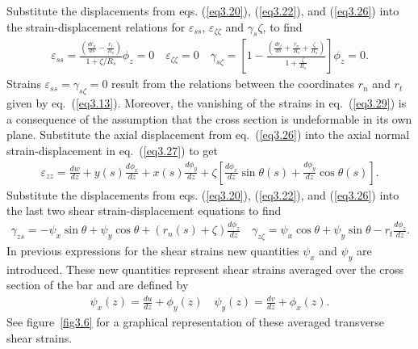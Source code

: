 \documentclass{AeroStructure-ERJohnson}
\begin{document}
Substitute the displacements from eqs. (\ref{eq3.20}), (\ref{eq3.22}), and (\ref{eq3.26}) into the strain-displacement relations for $\varepsilon_{ss}$, $\mathcal{\varepsilon}_{\zeta \zeta}$ and $\gamma_{s} \zeta$, to find
\begin{align}\label{eq3.29}
\varepsilon_{s s}=\frac{\left(\frac{d r_{n}}{d s}-\frac{r_{t}}{R_{s}}\right)}{1+\zeta / R_{s}} \phi_{z}=0 \quad \varepsilon_{\zeta \zeta}=0 \quad \gamma_{s \zeta}=\left[1-\frac{\left(\frac{d r_{t}}{d s}+\frac{r_{n}}{R_{s}}+\frac{\zeta}{R_{s}}\right)}{1+\frac{\zeta}{R_{s}}}\right] \phi_{z}=0.
\end{align}
Strains $\varepsilon_{s s}=\gamma_{s \zeta}=0$ result from the relations between the coordinates $r_{n}$ and $r_{t}$ given by eq.~(\ref{eq3.13}). Moreover, the vanishing of the strains in eq.~(\ref{eq3.29}) is a consequence of the assumption that the cross section is undeformable in its own plane. Substitute the axial displacement from eq.~(\ref{eq3.26}) into the axial normal strain-displacement in eq.~(\ref{eq3.27}) to get
\begin{align}\label{eq3.30}
\varepsilon_{z z}=\frac{d w}{d z}+y(s) \frac{d \phi_{x}}{d z}+x(s) \frac{d \phi_{y}}{d z}+\zeta\left[\frac{d \phi_{x}}{d z} \sin \theta(s)+\frac{d \phi_{y}}{d z} \cos \theta(s)\right].
\end{align}
Substitute the displacements from eqs. (\ref{eq3.20}), (\ref{eq3.22}), and (\ref{eq3.26}) into the last two shear strain-displacement equations to find
\begin{align}\label{eq3.31}
\gamma_{z s}=-\psi_{x} \sin \theta+\psi_{y} \cos \theta+\left(r_{n}(s)+\zeta\right) \frac{d \phi_{z}}{d z} \quad \gamma_{z \zeta}=\psi_{x} \cos \theta+\psi_{y} \sin \theta-r_{t} \frac{d \phi_{z}}{d z}.
\end{align}
In previous expressions for the shear strains new quantities $\psi_{x}$ and $\psi_{y}$ are introduced. These new quantities represent shear strains averaged over the cross section of the bar and are defined by
\begin{align}\label{eq3.32}
\psi_{x}(z)=\frac{d u}{d z}+\phi_{y}(z) \quad \psi_{y}(z)=\frac{d v}{d z}+\phi_{x}(z).
\end{align}
See figure~\ref{fig3.6} for a graphical representation of these averaged transverse shear strains.


{\def\thefigure{3.6}
}
\end{document}
